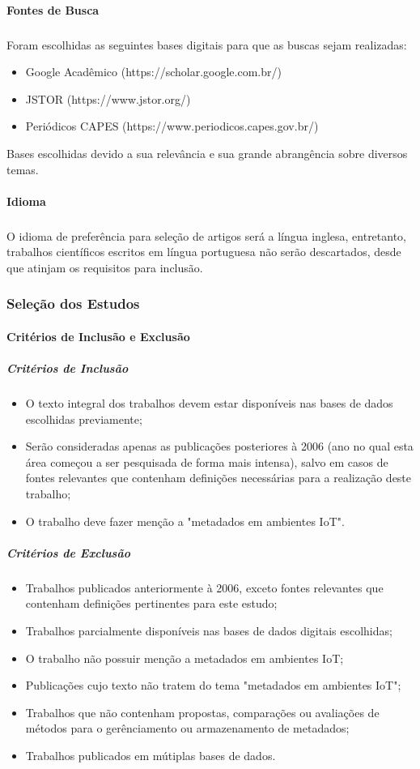 \paragraph{Fontes de Busca}
\subparagraph{}
 Foram escolhidas as seguintes bases digitais para que as buscas sejam realizadas:
\begin{itemize}
  \item Google Acadêmico (https://scholar.google.com.br/)
  \item JSTOR (https://www.jstor.org/)
  \item Periódicos CAPES (https://www.periodicos.capes.gov.br/)
\end{itemize}
\quad Bases escolhidas devido a sua relevância e sua grande abrangência sobre diversos temas.
\pagebreak
\paragraph{Idioma}
\subparagraph{}
\quad O idioma de preferência para seleção de artigos será a língua inglesa, entretanto, trabalhos científicos escritos em
língua portuguesa não serão descartados, desde que atinjam os requisitos para inclusão.

\subsubsection{Seleção dos Estudos}
\paragraph{Critérios de Inclusão e Exclusão}
\subparagraph{Critérios de Inclusão}
\begin{itemize}
  \item O texto integral dos trabalhos devem estar disponíveis nas bases de dados escolhidas previamente;
  \item Serão consideradas apenas as publicações posteriores à 2006 (ano no qual esta área começou a ser pesquisada de forma mais intensa), salvo em casos de fontes relevantes que contenham definições necessárias para a realização deste trabalho;
  \item O trabalho deve fazer menção a "metadados em ambientes \acrlong{IoT}".
\end{itemize}

\subparagraph{Critérios de Exclusão}
\begin{itemize}
  \item Trabalhos publicados anteriormente à 2006, exceto fontes relevantes que contenham definições pertinentes para este estudo;
  \item Trabalhos parcialmente disponíveis nas bases de dados digitais escolhidas;
  \item O trabalho não possuir menção a metadados em ambientes \acrlong{IoT};
  \item Publicações cujo texto não tratem do tema "metadados em ambientes \acrshort{IoT}";
  \item Trabalhos que não contenham propostas, comparações ou avaliações de métodos para o gerênciamento ou armazenamento de metadados;
  \item Trabalhos publicados em mútiplas bases de dados.
\end{itemize}

